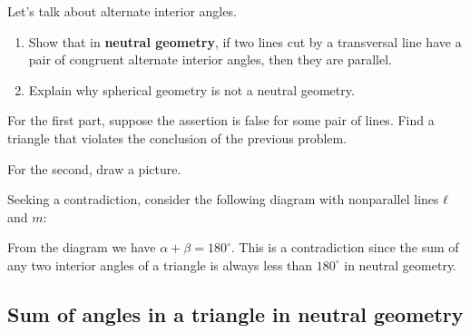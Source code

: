 \documentclass[noauthor,nooutcomes,12pt,hints,newpage,handout]{ximera}
\begin{document}
\begin{problem}\label{ng_parallel}
  Let's talk about alternate interior angles.
  \begin{enumerate}
  \item Show that in \textbf{neutral geometry}, if two lines cut by a
    transversal line have a pair of congruent alternate interior
    angles, then they are parallel.
  \item Explain why spherical geometry is not a neutral geometry.
  \end{enumerate}
\begin{hint}
For the first part, suppose the assertion is false for some pair of
lines. Find a triangle that violates the conclusion of the previous
problem.

For the second, draw a picture.
\end{hint}
\begin{freeResponse}
Seeking a contradiction, consider the following diagram with
nonparallel lines $\ell$ and $m$:
\begin{image}
\end{image}
From the diagram we have $\alpha + \beta = 180^\circ$. This is a
contradiction since the sum of any two interior angles of a triangle
is always less than $180^\circ$ in neutral geometry.
\end{freeResponse}

\end{problem}







\subsection{Sum of angles in a triangle in neutral geometry}
\end{document}
